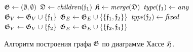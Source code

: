 

\begin{figure}[htb!]
\begin{algorithmic}[1]
\STATE $\mathfrak{G} \gets (\emptyset, \emptyset)$
\FORALL{$\gf_1 \in \gFs$}
    \STATE $\mathfrak{D} \gets \textit{children}(\mathfrak{f}_1)$
    \STATE $\mathfrak{K} \gets \textit{merge}(\mathfrak{D})$
    \STATE $\textit{type}(\mathfrak{f}_1) \gets \textit{any}$
    \STATE $\mathfrak{G}_V \gets \mathfrak{G}_V \cup \{\mathfrak{f}_1\}$
    \FORALL{$\gf_2 \in \gK$}
        \STATE $\mathfrak{G}_E \gets \mathfrak{G}_E \cup \{\{\mathfrak{f}_1, \mathfrak{f}_2\}\}$
        \IF{$\gf_2 \notin \gD$}
            \STATE {}
            \STATE $\textit{type}(\mathfrak{f}_2) \gets \textit{fixed}$
            \STATE $\mathfrak{G}_V \gets \mathfrak{G}_V \cup \{\mathfrak{f}_2\}$
                \STATE $\mathfrak{G}_E \gets \mathfrak{G}_E \cup \{\{\mathfrak{f}_2, \mathfrak{f}_3\}\}$
            \ENDFOR
        \ENDIF
    \ENDFOR
\ENDFOR
\end{algorithmic}
\caption{Алгоритм построения графа $\mathfrak{G}$ по диаграмме Хассе $\mathfrak{H}$.}
\label{alg:build_gg}
\end{figure}

